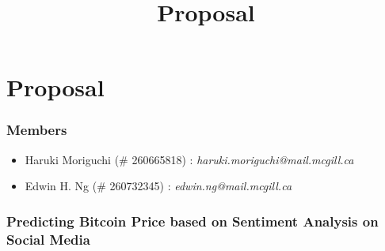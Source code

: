 \documentclass[12pt,a4paper]{report}
\begin{document}
\title{Proposal\\
}


\setcounter{page}{1}
\thispagestyle{empty} 


\chapter*{Proposal}
\subsection*{Members}
\begin{itemize}
\item Haruki Moriguchi (\# 260665818) : \textit{haruki.moriguchi@mail.mcgill.ca}
\item Edwin H. Ng (\# 260732345) : \textit{edwin.ng@mail.mcgill.ca}
\end{itemize}

\subsection*{Predicting Bitcoin Price based on Sentiment Analysis on Social Media}
\end{document}
